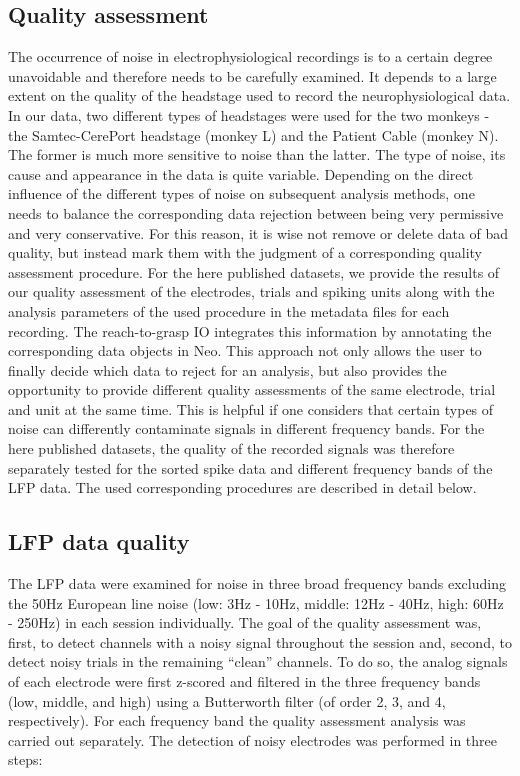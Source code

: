 \subsection{Quality assessment}

The occurrence of noise in electrophysiological recordings is to a certain degree unavoidable and therefore needs to be carefully examined. It depends to a large extent on the quality of the headstage used to record the neurophysiological data. In our data, two different types of headstages were used for the two monkeys - the Samtec-CerePort headstage (monkey L) and the Patient Cable (monkey N). The former is much more sensitive to noise than the latter. The type of noise, its cause and appearance in the data is quite variable. Depending on the direct influence of the different types of noise on subsequent analysis methods, one needs to balance the corresponding data rejection between being very permissive and very conservative. For this reason, it is wise not remove or delete data of bad quality, but instead mark them with the judgment of a corresponding quality assessment procedure. For the here published datasets, we provide the results of our quality assessment of the electrodes, trials and spiking units along with the analysis parameters of the used procedure in the  metadata files for each recording. The reach-to-grasp IO integrates this information by annotating the corresponding data objects in Neo. This approach not only allows the user to finally decide which data to reject for an analysis, but also provides the opportunity to provide different quality assessments of the same electrode, trial and unit at the same time. This is helpful if one considers that certain types of noise can differently contaminate signals in different frequency bands. For the here published datasets, the quality of the recorded signals was therefore separately tested for the sorted spike data and different frequency bands of the LFP data. The used corresponding procedures are described in detail below. 

\subsection{LFP data quality}

The LFP data were examined for noise in three broad frequency bands excluding the 50Hz European line noise (low: 3Hz - 10Hz, middle: 12Hz - 40Hz, high: 60Hz - 250Hz) in each session individually. The goal of the quality assessment was, first, to detect channels with a noisy signal throughout the session and, second, to detect noisy trials in the remaining “clean” channels. To do so, the analog signals of each electrode were first z-scored and filtered in the three frequency bands (low, middle, and high) using a Butterworth filter (of order 2, 3, and 4, respectively). For each frequency band the quality assessment analysis was carried out separately. The detection of noisy electrodes was performed in three steps: 

